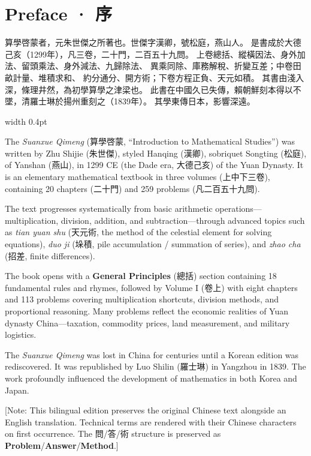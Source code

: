 \documentclass[10pt,a4paper]{article}
\newlength{\cnwidth}
\newlength{\enwidth}
\newcommand{\bilingual}[2]{%
  \noindent%
  \begin{minipage}[t]{\cnwidth}%
    #1%
  \end{minipage}%
  \hfill\vrule width 0.4pt\hfill%
  \begin{minipage}[t]{\enwidth}%
    #2%
  \end{minipage}%
  \par\smallskip%
}
\newcommand{\bilingualsection}[2]{%
  \section*{#1 · #2}
  \addcontentsline{toc}{section}{#1 · #2}
}
\newcommand{\transnote}[1]{%
  \par\smallskip\noindent\textcolor{notecolor}{\small[Note: #1]}\par\smallskip
}
\begin{document}
\tableofcontents
\newpage


\bilingualsection{Preface}{序}

\bilingual{%
  算學啓蒙者，元朱世傑之所著也。世傑字漢卿，號松庭，燕山人。
  是書成於大德己亥（1299年），凡三卷，二十門，二百五十九問。
  上卷總括、縱橫因法、身外加法、留頭乘法、身外減法、九歸除法、
  異乘同除、庫務解稅、折變互差；中卷田畝計量、堆積求和、
  約分通分、開方術；下卷方程正負、天元如積。
  其書由淺入深，條理井然，為初學算學之津梁也。
  此書在中國久已失傳，賴朝鮮刻本得以不墜，清羅士琳於揚州重刻之（1839年）。
  其學東傳日本，影響深遠。
}{%
  The \textit{Suanxue Qimeng} (算學啓蒙, ``Introduction to Mathematical Studies'')
  was written by Zhu Shijie (朱世傑), styled Hanqing (漢卿), sobriquet Songting
  (松庭), of Yanshan (燕山), in 1299 CE (the Dade era, 大德己亥) of the Yuan Dynasty.
  It is an elementary mathematical textbook in three volumes (上中下三卷), containing
  20 chapters (二十門) and 259 problems (凡二百五十九問).

  The text progresses systematically from basic arithmetic operations---multiplication,
  division, addition, and subtraction---through advanced topics such as \textit{tian yuan shu}
  (天元術, the method of the celestial element for solving equations), \textit{duo ji}
  (垛積, pile accumulation / summation of series), and \textit{zhao cha} (招差, finite
  differences).

  The book opens with a \textbf{General Principles} (總括) section containing 18
  fundamental rules and rhymes, followed by Volume I (卷上) with eight chapters
  and 113 problems covering multiplication shortcuts, division methods, and
  proportional reasoning. Many problems reflect the economic realities of Yuan
  dynasty China---taxation, commodity prices, land measurement, and military logistics.

  The \textit{Suanxue Qimeng} was lost in China for centuries until a Korean edition
  was rediscovered. It was republished by Luo Shilin (羅士琳) in Yangzhou in 1839.
  The work profoundly influenced the development of mathematics in both Korea and
  Japan.
}

\transnote{This bilingual edition preserves the original Chinese text alongside
an English translation. Technical terms are rendered with their Chinese
characters on first occurrence. The 問/答/術 structure is preserved as
\textbf{Problem}/\textbf{Answer}/\textbf{Method}.}
\end{document}
